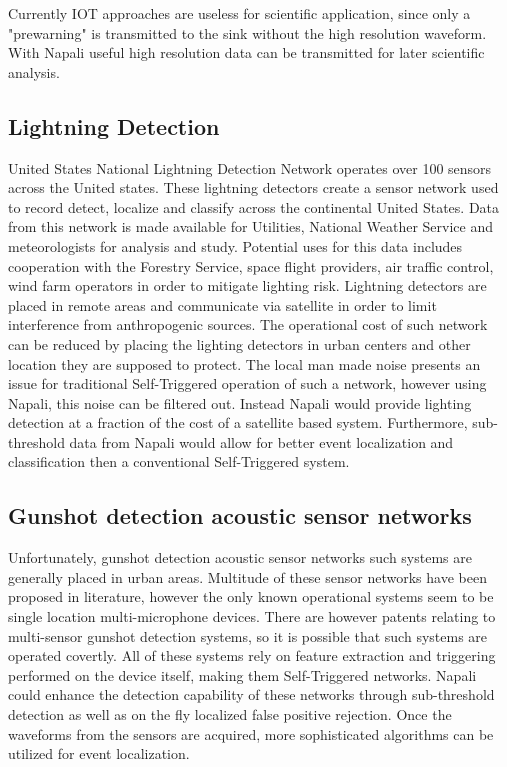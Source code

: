 Currently IOT approaches are useless for scientific application, since only a "prewarning" is transmitted to the sink without the high resolution waveform.
With Napali useful high resolution data can be transmitted for later scientific analysis.

\subsection{Lightning Detection}\label{subsec:lightning-detection}
United States National Lightning Detection Network operates over 100 sensors across the United states. \cite{cummins1998combined}
These lightning detectors create a sensor network used to record detect, localize and  classify across the continental United States.
Data from this network is made available for Utilities, National Weather Service and meteorologists for analysis and study.
Potential uses for this data includes cooperation with the Forestry Service, space flight providers, air traffic control, wind farm operators in order to mitigate lighting risk.\cite{nag2013upgrade}
Lightning detectors are placed in remote areas and communicate via satellite in order to limit interference from anthropogenic sources.
The operational cost of such network can be reduced by placing the lighting detectors in urban centers and other location they are supposed to protect.
The local man made noise presents an issue for traditional Self-Triggered operation of such a network, however using Napali, this noise can be filtered out.
Instead Napali would provide lighting detection at a fraction of the cost of a satellite based system.
Furthermore, sub-threshold data from Napali would allow for better event localization and classification then a conventional Self-Triggered system.

\subsection{Gunshot detection acoustic sensor networks}\label{subsec:gunshot-detection-acustic-sensor-network}
Unfortunately, gunshot detection acoustic sensor networks such systems are generally placed in urban areas.
Multitude of these sensor networks have been proposed in literature, however the only known operational systems seem to be single
location multi-microphone devices. \cite{bandi2012novel} \cite{khalid2013gunshot}
There are however patents relating to multi-sensor gunshot detection systems, so it is possible that such systems are operated covertly.
All of these systems rely on feature extraction and triggering performed on the device itself, making them Self-Triggered networks.
Napali could enhance the detection capability of these networks through sub-threshold detection as well as on the fly localized false positive rejection.
Once the waveforms from the sensors are acquired, more sophisticated algorithms can be utilized for event localization.

